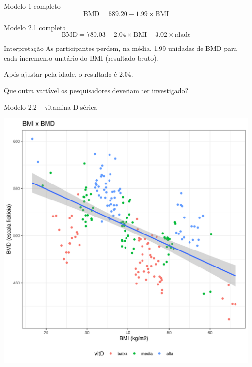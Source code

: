 \documentclass{beamer}
\begin{document}
\begin{frame}{\scriptsize }
  \begin{exampleblock}{Modelo 1 completo}
    \tiny
    \begin{displaymath}
      \text{BMD} =589.20 -1.99 \times\text{BMI}
    \end{displaymath}
  \end{exampleblock}
  \begin{exampleblock}{Modelo 2.1 completo}
    \footnotesize
    \begin{displaymath}
      \text{BMD} =780.03 -2.04 \times\text{BMI} -3.02 \times\text{idade}
    \end{displaymath}
  \end{exampleblock}
  \begin{exampleblock}{Interpretação}
    \footnotesize
    As participantes perdem, na média, 1.99 unidades de BMD para cada incremento unitário do BMI (resultado bruto).

    \bigskip
    Após ajustar pela idade, o resultado é 2.04.
  \end{exampleblock}
\end{frame}

\begin{frame}{\scriptsize }
  \begin{center}
    Que outra variável os pesquisadores deveriam ter investigado?
  \end{center}
\end{frame}

\begin{frame}{\scriptsize Modelo 2.2 -- vitamina D sérica}
  \begin{center}
    \includegraphics[height=.9\textheight]{Cap31-32/pratica-rlm2_2}
  \end{center}
\end{frame}
\end{document}
